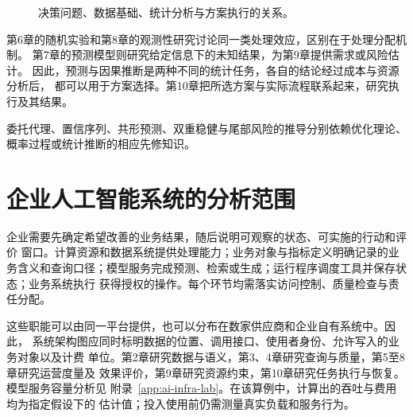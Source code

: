 \begin{figure}[htbp]
\centering
{}
\caption{决策问题、数据基础、统计分析与方案执行的关系。}
\label{fig:book-map}
\end{figure}

第6章的随机实验和第8章的观测性研究讨论同一类处理效应，区别在于处理分配机制。
第7章的预测模型则研究给定信息下的未知结果，为第9章提供需求或风险估计。
因此，预测与因果推断是两种不同的统计任务，各自的结论经过成本与资源分析后，
都可以用于方案选择。第10章把所选方案与实际流程联系起来，研究执行及其结果。

委托代理、置信序列、共形预测、双重稳健与尾部风险的推导分别依赖优化理论、
概率过程或统计推断的相应先修知识。

\section*{企业人工智能系统的分析范围}
企业需要先确定希望改善的业务结果，随后说明可观察的状态、可实施的行动和评价
窗口。计算资源和数据系统提供处理能力；业务对象与指标定义明确记录的业务含义和查询口径；模型服务完成预测、检索或生成；运行程序调度工具并保存状态；业务系统执行
获得授权的操作。每个环节均需落实访问控制、质量检查与责任分配。

这些职能可以由同一平台提供，也可以分布在数家供应商和企业自有系统中。因此，
系统架构图应同时标明数据的位置、调用接口、使用者身份、允许写入的业务对象以及计费
单位。第2章研究数据与语义，第3、4章研究查询与质量，第5至8章研究运营度量及
效果评价，第9章研究资源约束，第10章研究任务执行与恢复。模型服务容量分析见
附录~\ref{app:ai-infra-lab}。在该算例中，计算出的吞吐与费用均为指定假设下的
估计值；投入使用前仍需测量真实负载和服务行为。

